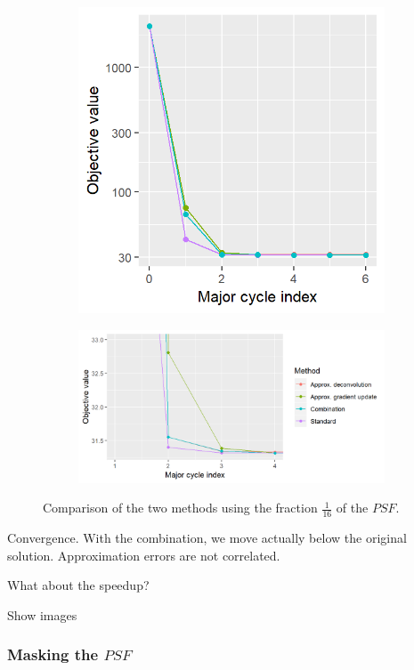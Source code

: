 \begin{figure}[h]
	\centering
	\begin{subfigure}[b]{0.33\linewidth}
		\includegraphics[width=\linewidth]{./chapters/10.results/gradient/comparison.png}
	\end{subfigure}
	\begin{subfigure}[b]{0.66\linewidth}
		\includegraphics[width=\linewidth]{./chapters/10.results/gradient/comparison_zoom.png}
	\end{subfigure}
	
	\caption{Comparison of the two methods using the fraction $\frac{1}{16}$ of the $PSF$.}
	\label{results:gradients:comparison}
\end{figure}

Convergence. With the combination, we move actually below the original solution. 
Approximation errors are not correlated.

What about the speedup?

Show images

\subsubsection{Masking the $PSF$}
